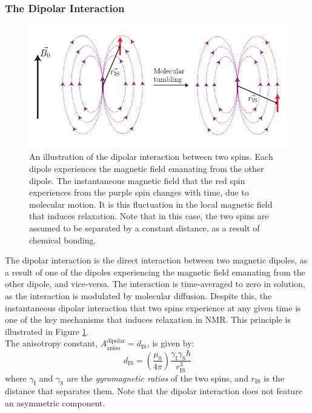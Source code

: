 \subsubsection{The Dipolar Interaction}
\begin{figure}
\centering
\includegraphics[scale=0.9]{./Figures/SimonsFigs/Dipolar.pdf}
\caption{An illustration of the dipolar interaction between two spins. Each dipole experiences the magnetic field emanating from the other dipole. The instantaneous magnetic field that the red spin experiences from the purple spin changes with time, due to molecular motion. It is this fluctuation in the local magnetic field that induces relaxation. Note that in this case, the two spins are assumed to be separated by a constant distance, as a result of chemical bonding.}
\label{Dipolar}
\end{figure}
The dipolar interaction is the direct interaction between two magnetic dipoles, as a result of one of the dipoles experiencing the magnetic field emanating from the other dipole, and vice-versa. The interaction is time-averaged to zero in solution, as the interaction is modulated by molecular diffusion. Despite this, the instantaneous dipolar interaction that two spins experience at any given time is one of the key mechanisms that induces relaxation in NMR. This principle is illustrated in Figure \ref{Dipolar}.\\
The anisotropy constant, $A_{\text{aniso}}^{\text{dipolar}} = d_{\text{IS}}$, is given by:
\begin{equation}
\label{DipConst}
d_{\text{IS}} = \left(\frac{\mu_0}{4 \pi}\right) \frac{\gamma_{\text{I}} \gamma_{\text{S}} \hbar}{r_{\text{IS}}^3}
\end{equation}
where $\gamma_{\text{I}}$ and $\gamma_{\text{S}}$ are the \textit{gyromagnetic ratios} of the two spins, and $r_{\text{IS}}$ is the distance that separates them. Note that the dipolar interaction does not feature an asymmetric component.
